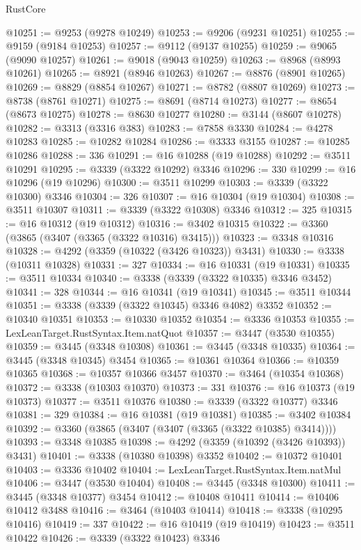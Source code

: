 \begin{lexlean}{RustCore}
\begin{coremodule}
@10251 := @9253 (@9278 @10249)
@10253 := @9206 (@9231 @10251)
@10255 := @9159 (@9184 @10253)
@10257 := @9112 (@9137 @10255)
@10259 := @9065 (@9090 @10257)
@10261 := @9018 (@9043 @10259)
@10263 := @8968 (@8993 @10261)
@10265 := @8921 (@8946 @10263)
@10267 := @8876 (@8901 @10265)
@10269 := @8829 (@8854 @10267)
@10271 := @8782 (@8807 @10269)
@10273 := @8738 (@8761 @10271)
@10275 := @8691 (@8714 @10273)
@10277 := @8654 (@8673 @10275)
@10278 := @8630 @10277
@10280 := @3144 (@8607 @10278)
@10282 := @3313 (@3316 @383)
@10283 := @7858 @3330
@10284 := @4278 @10283
@10285 := @10282 @10284
@10286 := @3333 @3155
@10287 := @10285 @10286
@10288 := 336
@10291 := @16 @10288 (@19 @10288)
@10292 := @3511 @10291
@10295 := @3339 (@3322 @10292) @3346
@10296 := 330
@10299 := @16 @10296 (@19 @10296)
@10300 := @3511 @10299
@10303 := @3339 (@3322 @10300) @3346
@10304 := 326
@10307 := @16 @10304 (@19 @10304)
@10308 := @3511 @10307
@10311 := @3339 (@3322 @10308) @3346
@10312 := 325
@10315 := @16 @10312 (@19 @10312)
@10316 := @3402 @10315
@10322 := @3360 (@3865 (@3407 (@3365 (@3322 @10316) @3415)))
@10323 := @3348 @10316
@10328 := @4292 (@3359 (@10322 (@3426 @10323)) @3431)
@10330 := @3338 (@10311 @10328)
@10331 := 327
@10334 := @16 @10331 (@19 @10331)
@10335 := @3511 @10334
@10340 := @3338 (@3339 (@3322 @10335) @3346 @3452)
@10341 := 328
@10344 := @16 @10341 (@19 @10341)
@10345 := @3511 @10344
@10351 := @3338 (@3339 (@3322 @10345) @3346 @4082) @3352
@10352 := @10340 @10351
@10353 := @10330 @10352
@10354 := @3336 @10353
@10355 := LexLeanTarget.RustSyntax.Item.natQuot
@10357 := @3447 (@3530 @10355)
@10359 := @3445 (@3348 @10308)
@10361 := @3445 (@3348 @10335)
@10364 := @3445 (@3348 @10345) @3454
@10365 := @10361 @10364
@10366 := @10359 @10365
@10368 := @10357 @10366 @3457
@10370 := @3464 (@10354 @10368)
@10372 := @3338 (@10303 @10370)
@10373 := 331
@10376 := @16 @10373 (@19 @10373)
@10377 := @3511 @10376
@10380 := @3339 (@3322 @10377) @3346
@10381 := 329
@10384 := @16 @10381 (@19 @10381)
@10385 := @3402 @10384
@10392 := @3360 (@3865 (@3407 (@3407 (@3365 (@3322 @10385) @3414))))
@10393 := @3348 @10385
@10398 := @4292 (@3359 (@10392 (@3426 @10393)) @3431)
@10401 := @3338 (@10380 @10398) @3352
@10402 := @10372 @10401
@10403 := @3336 @10402
@10404 := LexLeanTarget.RustSyntax.Item.natMul
@10406 := @3447 (@3530 @10404)
@10408 := @3445 (@3348 @10300)
@10411 := @3445 (@3348 @10377) @3454
@10412 := @10408 @10411
@10414 := @10406 @10412 @3488
@10416 := @3464 (@10403 @10414)
@10418 := @3338 (@10295 @10416)
@10419 := 337
@10422 := @16 @10419 (@19 @10419)
@10423 := @3511 @10422
@10426 := @3339 (@3322 @10423) @3346

\end{coremodule}
\end{lexlean}
